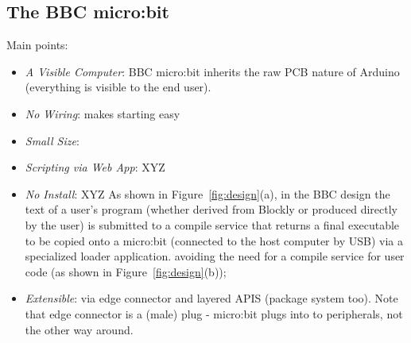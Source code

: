 

    
\subsection{The BBC micro:bit}

Main points:
\begin{itemize}
\item {\em A Visible Computer}: BBC micro:bit inherits the raw PCB nature of Arduino  (everything is visible to the end user).
\item {\em No Wiring}: makes starting easy
\item {\em Small Size}: 
\item {\em Scripting via Web App}: XYZ
\item {\em No Install}: XYZ
As shown in Figure~\ref{fig:design}(a), in the BBC design
the text of a user's program (whether derived from Blockly or produced directly by the user)
is submitted to a compile service that returns a final executable to be copied onto a micro:bit (connected to the host 
computer by USB) via a specialized loader application.  
avoiding the need for a compile service for user code (as shown 
in Figure~\ref{fig:design}(b));
\item {\em Extensible}: via edge connector and layered APIS (package system too). Note
that edge connector is a (male) plug - micro:bit plugs into to peripherals, not the
other way around.
\end{itemize}



 

